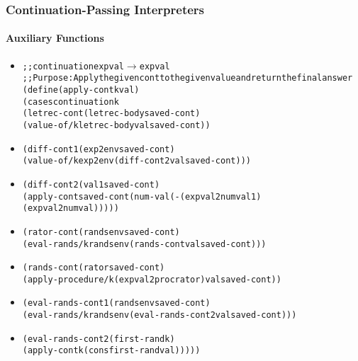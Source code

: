 \documentclass{beamer}
\newcommand{\arrow}{\(\rightarrow\)}
\begin{document}
\begin{frame}[fragile]
\frametitle{Continuation-Passing Interpreters}
\framesubtitle{Auxiliary Functions}
\begin{scriptsize}
\begin{itemize}
\item<1->
\begin{alltt}
;; continuation expval \arrow{} expval
;; Purpose: Apply the given cont to the given value and return the final answer
(define (apply-cont k val)
  (cases continuation k
    (letrec-cont (letrec-body saved-cont)
     (value-of/k letrec-body val saved-cont))
\end{alltt}

\item<2->
\begin{alltt}
    (diff-cont1 (exp2 env saved-cont)
     (value-of/k exp2 env (diff-cont2 val saved-cont)))
\end{alltt}

\item<3->
\begin{alltt}
    (diff-cont2 (val1 saved-cont)
     (apply-cont saved-cont (num-val (- (expval2num val1)
                                        (expval2num val)))))
\end{alltt}

\item<4->
\begin{alltt}
    (rator-cont (rands env saved-cont)
     (eval-rands/k rands env (rands-cont val saved-cont)))
\end{alltt}

\item<5->
\begin{alltt}
    (rands-cont (rator saved-cont)
     (apply-procedure/k (expval2proc rator) val saved-cont))
\end{alltt}

\item<6->
\begin{alltt}
    (eval-rands-cont1 (rands env saved-cont)
     (eval-rands/k rands env (eval-rands-cont2 val saved-cont)))
\end{alltt}

\item<7->
\begin{alltt}
    (eval-rands-cont2 (first-rand k)
     (apply-cont k (cons first-rand val)))))
\end{alltt}

\end{itemize}
\end{scriptsize}
\end{frame}
\end{document}

